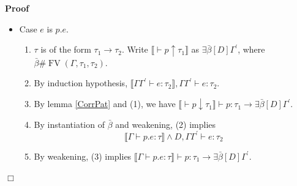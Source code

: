 \documentclass{article}
\newcommand{\tmname}[1]{\textsc{#1}}
\newcommand{\tmop}[1]{\ensuremath{\operatorname{#1}}}
\newcommand{\tmstrong}[1]{\textbf{#1}}
\newenvironment{proof}{\noindent\textbf{Proof\ }}{\hspace*{\fill}$\Box$\medskip}
\begin{document}
\begin{proof}
\begin{itemize}
\begin{enumerate}
      \item Let $D = \forall \beta . (\chi (\beta) \Rightarrow \llbracket
      \Gamma^{\prime} \vdash e_1 : \beta \rrbracket)$. Since $D \wedge \chi
      (\beta)$ implies $\left\llbracket \Gamma^{\prime} \vdash e_1 :
      {\nobreak} \beta \right\rrbracket$, by weakening of (2), we have $D
      \wedge \chi (\beta), \Gamma^{\prime} \vdash e_1 : {\nobreak} \beta$.
      From (1) we have $\alpha \# \tmop{FV} (D, \Gamma^{\prime}, \tau)$, by
      {\tmname{Gen}} we have $D \wedge \exists \beta . \chi (\beta),
      \Gamma^{\prime} \vdash e_1 : \forall \beta [\chi (\beta)] . \beta$, by
      (1) and renaming we have
      \[ D \wedge \exists \alpha . \chi (\alpha), \Gamma^{\prime} \vdash e_1 :
         \sigma . \]
      \item By weakening of both (2) and (3), and by {\tmname{LetRec}}, we
      have $\left\llbracket \Gamma \vdash \text{{\tmstrong{let rec}}} x = e_1 
      \text{{\tmstrong{in}}} e_2 : \tau \right\rrbracket, \Gamma \vdash
      \text{{\tmstrong{let rec}}} x = e_1  \text{{\tmstrong{in}}} e_2 : \tau$.
    \end{enumerate}
    \item Case $e$ is $p.e$.
    \begin{enumerate}
      \item $\tau$ is of the form $\tau_1 \rightarrow \tau_2$. Write
      $\llbracket \vdash p \uparrow \tau_1 \rrbracket$ as $\exists \bar{\beta}
      [D] \Gamma^{\prime}$, where $\bar{\beta} \# \tmop{FV} (\Gamma, \tau_1,
      \tau_2)$.
      
      \item By induction hypothesis, $\llbracket \Gamma \Gamma^{\prime} \vdash
      e : \tau_2 \rrbracket, \Gamma \Gamma^{\prime} \vdash e : \tau_2$.
      
      \item By lemma \ref{CorrPat} and (1), we have $\llbracket \vdash p
      \downarrow \tau_1 \rrbracket \vdash p : \tau_1 \longrightarrow \exists
      \bar{\beta} [D] \Gamma^{\prime}$.
      
      \item By instantiation of $\bar{\beta}$ and weakening, (2) implies
      \[ \llbracket \Gamma \vdash p.e : \tau \rrbracket \wedge D, \Gamma
         \Gamma^{\prime} \vdash e : \tau_2 \]
      \item By weakening, (3) implies $\llbracket \Gamma \vdash p.e : \tau
      \rrbracket \vdash p : \tau_1 \longrightarrow \exists \bar{\beta} [D]
      \Gamma^{\prime}$.
      

\end{enumerate}
\end{itemize}
\end{proof}
\end{document}
